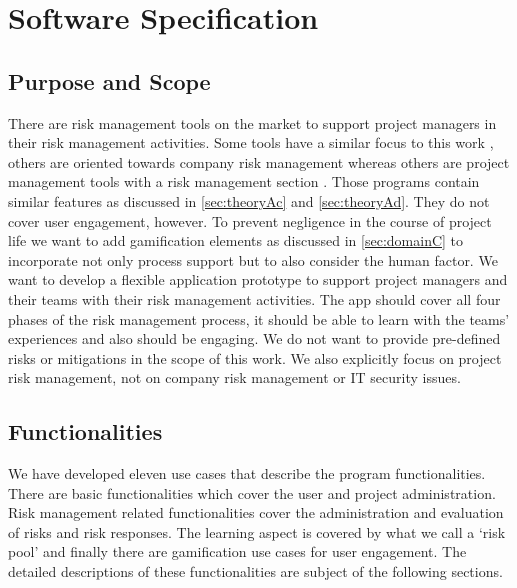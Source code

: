 \newpage
\section{Software Specification}
\label{sec:domainB}

\subsection{Purpose and Scope}
\label{sec:domainBa}
There are risk management tools on the market to support project managers in their risk management activities. Some tools have a similar focus to this work \cite{OperationalRiskManagement}, \cite{RiskManagementSoftware} others are oriented towards company risk management \cite{QHSERiskCompliance} whereas others are project management tools with a risk management section \cite{https://www.ntaskmanager.com/}. Those programs contain similar features as discussed in \ref{sec:theoryAc} and \ref{sec:theoryAd}. They do not cover user engagement, however. To prevent negligence in the course of project life we want to add gamification elements as discussed in \ref{sec:domainC} to incorporate not only process support but to also consider the human factor.
We want to develop a flexible application prototype to support project managers and their teams with their risk management activities. The app should cover all four phases of the risk management process, it should be able to learn with the teams’ experiences and also should be engaging.
We do not want to provide pre-defined risks or mitigations in the scope of this work. We also explicitly focus on project risk management, not on company risk management or IT security issues. 

\subsection{Functionalities}
\label{sec:domainBb}
We have developed eleven use cases that describe the program functionalities. There are basic functionalities which cover the user and project administration. Risk management related functionalities cover the administration and evaluation of risks and risk responses. The learning aspect is covered by what we call a ‘risk pool’ and finally there are gamification use cases for user engagement. The detailed descriptions of these functionalities are subject of the following sections. 

